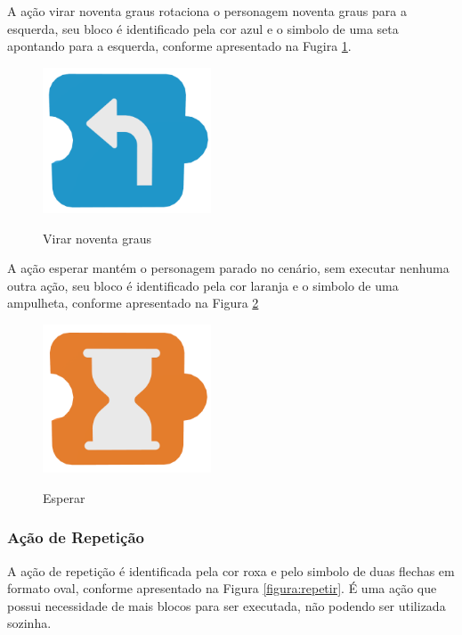         A ação virar noventa graus rotaciona o personagem noventa graus para a esquerda, seu bloco é identificado pela cor azul e o simbolo de uma seta apontando para a esquerda, conforme apresentado na Fugira \ref{figura:virar}.
        
        \begin{figure}[H]
            \caption{Virar noventa graus}
            \centering
            \includegraphics[width=5cm]{Imagens/Cap3/Blocos/Virar.png}
            \label{figura:virar}
        \end{figure}
        
        A ação esperar mantém o personagem parado no cenário, sem executar nenhuma outra ação, seu bloco é identificado pela cor laranja e o simbolo de uma ampulheta, conforme apresentado na Figura \ref{figura:esperar}
        
        \begin{figure}[H]
            \caption{Esperar}
            \centering
            \includegraphics[width=5cm]{Imagens/Cap3/Blocos/Esperar.png}
            \label{figura:esperar}
        \end{figure}
        
    \subsubsection{Ação de Repetição}
        A ação de repetição é identificada pela cor roxa e pelo simbolo de duas flechas em formato oval, conforme apresentado na Figura \ref{figura:repetir}. É uma ação que possui necessidade de mais blocos para ser executada, não podendo ser utilizada sozinha.
        
